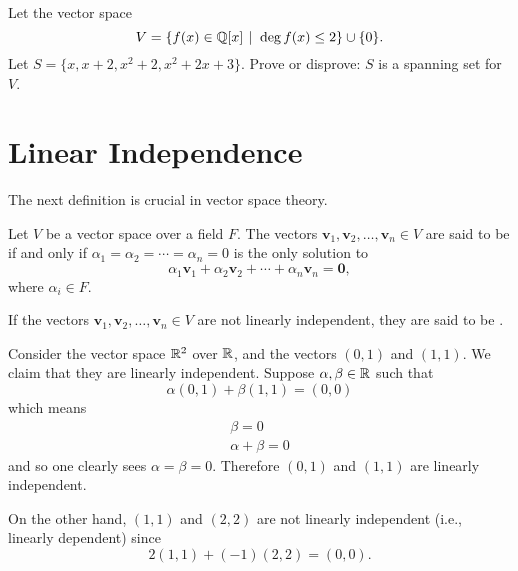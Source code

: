 \begin{exercise}
    Let the vector space
    \[
        V = \{f(x) \in \Q[x] \vert \deg f(x) \leq 2\} \cup \{0\}.
    \]
    Let $S = \{x, x + 2, x^2 + 2, x^2 + 2x + 3\}$. Prove or disprove: $S$ is a spanning set for $V$.
\end{exercise}

\section{Linear Independence}
The next definition is crucial in vector space theory.
\begin{definition}
    Let $V$ be a vector space over a field $F$. The vectors $\textbf{v}_1, \textbf{v}_2, \dots, \textbf{v}_n \in V$ are said to be  if and only if $\alpha_1 = \alpha_2 = \cdots = \alpha_n = 0$ is the only solution to
    \[
        \alpha_1\textbf{v}_1 + \alpha_2\textbf{v}_2 + \cdots + \alpha_n\textbf{v}_n = \textbf{0},
    \]
    where $\alpha_i \in F$.

    If the vectors $\textbf{v}_1, \textbf{v}_2, \dots, \textbf{v}_n \in V$ are not linearly independent, they are said to be .
\end{definition}

\begin{example}
    Consider the vector space $\mathbb{R}^2$ over $\mathbb{R}$, and the vectors $(0, 1)$ and $(1, 1)$. We claim that they are linearly independent. Suppose $\alpha, \beta \in \mathbb{R}$ such that
    \[
        \alpha(0, 1) + \beta(1, 1) = (0, 0)
    \]
    which means
    \begin{align*}
        \beta = 0\\
        \alpha + \beta = 0
    \end{align*}
    and so one clearly sees $\alpha = \beta = 0$. Therefore $(0, 1)$ and $(1, 1)$ are linearly independent.

    On the other hand, $(1, 1)$ and $(2, 2)$ are not linearly independent (i.e., linearly dependent) since
    \[
        2(1,1) + (-1)(2, 2) = (0, 0).
    \]
\end{example}

